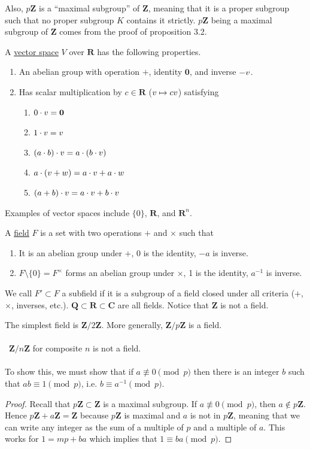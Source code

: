 \documentclass[11pt, oneside]{amsart}
\numberwithin{equation}{section}
\numberwithin{theorem}{section}
\theoremstyle{definition}
\let\bf\relax
\def\Z{\mathbf{Z}}
\def\R{\mathbf{R}}
\def\Q{\mathbf{Q}}
\def\C{\mathbf{C}}
\def\0{\mathbf{0}}
\begin{document}
Also, $p\Z$ is a ``maximal subgroup'' of $\Z$, meaning that it is a proper subgroup such that no proper subgroup $K$ contains it strictly. $p\Z$ being a maximal subgroup of $\Z$ comes from the proof of proposition 3.2.

A \underline{vector space} $V$ over $\R$ has the following properties.
\begin{enumerate}[label=(\roman*)]
\item An abelian group with operation $+$, identity $\mathbf{0}$, and inverse $-\bf{v}$.
\item Has scalar multiplication by $c\in\R$ ($\bf{v}\mapsto c\bf{v}$) satisfying
\begin{enumerate}[label=(\alph*)]
\item $0\cdot \bf{v} = \0$
\item $1\cdot \bf{v} = \bf{v}$
\item $(a\cdot b) \cdot\bf{v} = a\cdot (b\cdot \bf{v})$
\item $a\cdot (\bf{v} +\bf{w}) = a\cdot\bf{v} + a\cdot\bf{w}$
\item $(a+b)\cdot \bf{v} = a\cdot\bf{v} + b\cdot\bf{v}$
\end{enumerate}
\end{enumerate}
Examples of vector spaces include $\{0\}$, $\R$, and $\R^n$.

A \underline{field} $F$ is a set with two operations $+$ and $\times$ such that
\begin{enumerate}[label=(\roman*)]
\item It is an abelian group under $+$, 0 is the identity, $-a$ is inverse.
\item $F\setminus\{0\}=F^\times$ forms an abelian group under $\times$, 1 is the identity, $a^{-1}$ is inverse.
\end{enumerate}
We call $F'\subset F$ a subfield if it is a subgroup of a field closed under all criteria ($+$, $\times$, inverses, etc.). $\Q\subset\R\subset\C$ are all fields. Notice that $\Z$ is not a field.

The simplest field is $\Z/2\Z$. More generally, $\Z/p\Z$ is a field.\\\\
\dbend \ $\Z/n\Z$ for composite $n$ is not a field. \\\\
To show this, we must show that if $a\not\equiv 0 \pmod p$ then there is an integer $b$ such that $ab\equiv 1\pmod p$, i.e. $b\equiv a^{-1}\pmod p$.
\begin{proof}
Recall that $p\Z\subset \Z$ is a maximal subgroup. If $a\not\equiv 0 \pmod p$, then $a\notin p\Z$. Hence $p\Z+a\Z=\Z$ because $p\Z$ is maximal and $a$ is not in $p\Z$, meaning that we can write any integer as the sum of a multiple of $p$ and a multiple of $a$. This works for $1=mp+ba$ which implies that $1\equiv ba\pmod p$.
\end{proof}
\end{document}
